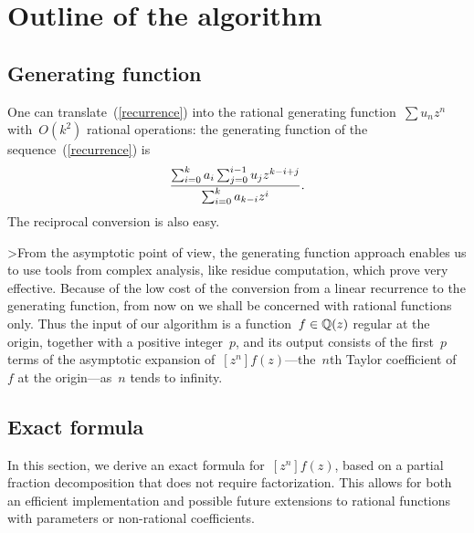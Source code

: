 \section{Outline of the algorithm}
\subsection{Generating function}

One can
translate~(\ref{recurrence})  into the rational   generating
function~$\sum{u_nz^n}$ with~$O(k^2)$  rational   operations:  the
generating function  of   the
sequence~(\ref{recurrence}) is
\[{\sum_{i=0}^k{a_i\sum_{j=0}^{i-1}{u_jz^{k-i+j}}}\over
\sum_{i=0}^k{a_{k-i}z^i}}.\] The  reciprocal  conversion is also easy.

>From the asymptotic point of view,  the generating function approach
enables us to use tools from complex analysis, like residue
computation, which prove very effective. Because of 
the  low cost of    the conversion from   a linear  recurrence to  the
generating function, from now on  we shall  be concerned with rational
functions   only. Thus   the    input    of   our   algorithm   is   a
function~$f\in{\Bbb Q}(z)$ regular  at the  origin, together with a positive
integer~$p$,  and its output  consists of  the  first~$p$ terms of the
asymptotic expansion  of~$[z^n]f(z)$---the~$n$th  Taylor coefficient
of~$f$   at the origin---as~$n$ tends to infinity.

\subsection{Exact formula}

In this section, we derive an exact formula
for~$[z^n]f(z)$, based on a partial fraction decomposition that does
not require factorization. This allows for both an efficient
implementation and possible future extensions to rational functions
with parameters or non-rational coefficients.

